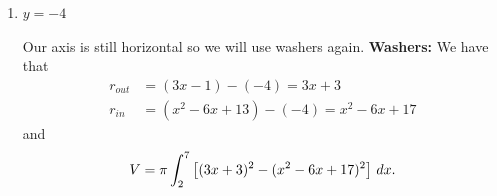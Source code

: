 \documentclass[handout]{ximera}
\begin{document}
\begin{problem}
\begin{enumerate}
\begin{freeResponse}
		
		
		\end{freeResponse}
		
		
		
		\item  $y=-4$  
		\begin{freeResponse}
		Our axis is still horizontal so we will use washers again. 
		{\bf Washers: }
		We have that
			\begin{align*}
			r_{out} &= (3x-1) - (-4) = 3x + 3 \\
			r_{in} &= (x^2 - 6x +13) - (-4) = x^2 - 6x + 17
			\end{align*}
		and
			\[
			V = \pi \int_2^7 \left[ (3x+3)^2 - (x^2-6x+17)^2 \right] \,d x.
			\]
		

\end{freeResponse}
\end{enumerate}
\end{problem}
\end{document}
